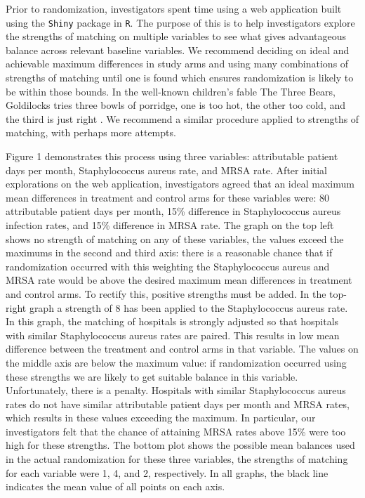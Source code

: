 \documentclass[]{sagej}
\begin{document}
Prior to randomization, investigators spent time using a web application
built using the \texttt{Shiny} package in \texttt{R}. The purpose of
this is to help investigators explore the strengths of matching on
multiple variables to see what gives advantageous balance across
relevant baseline variables. We recommend deciding on ideal and
achievable maximum differences in study arms and using many combinations
of strengths of matching until one is found which ensures randomization
is likely to be within those bounds. In the well-known children's fable
The Three Bears, Goldilocks tries three bowls of porridge, one is too
hot, the other too cold, and the third is just right \citep{3Bears}. We
recommend a similar procedure applied to strengths of matching, with
perhaps more attempts.

Figure 1 demonstrates this process using three variables: attributable
patient days per month, Staphylococcus aureus rate, and MRSA rate. After
initial explorations on the web application, investigators agreed that
an ideal maximum mean differences in treatment and control arms for
these variables were: 80 attributable patient days per month, 15\%
difference in Staphylococcus aureus infection rates, and 15\% difference
in MRSA rate. The graph on the top left shows no strength of matching on
any of these variables, the values exceed the maximums in the second and
third axis: there is a reasonable chance that if randomization occurred
with this weighting the Staphylococcus aureus and MRSA rate would be
above the desired maximum mean differences in treatment and control
arms. To rectify this, positive strengths must be added. In the
top-right graph a strength of 8 has been applied to the Staphylococcus
aureus rate. In this graph, the matching of hospitals is strongly
adjusted so that hospitals with similar Staphylococcus aureus rates are
paired. This results in low mean difference between the treatment and
control arms in that variable. The values on the middle axis are below
the maximum value: if randomization occurred using these strengths we
are likely to get suitable balance in this variable. Unfortunately,
there is a penalty. Hospitals with similar Staphylococcus aureus rates
do not have similar attributable patient days per month and MRSA rates,
which results in these values exceeding the maximum. In particular, our
investigators felt that the chance of attaining MRSA rates above 15\%
were too high for these strengths. The bottom plot shows the possible
mean balances used in the actual randomization for these three
variables, the strengths of matching for each variable were 1, 4, and 2,
respectively. In all graphs, the black line indicates the mean value of
all points on each axis.
\end{document}
